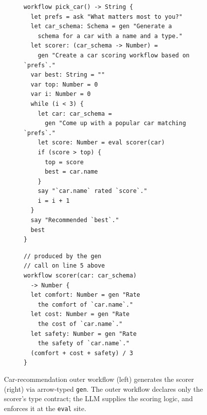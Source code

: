 \begin{figure}[ht!]
\centering
\begin{subfigure}[c]{0.50\linewidth}
\begin{lstlisting}[language=pact,basicstyle=\ttfamily\footnotesize,showstringspaces=false,breaklines=true,breakindent=0pt]
workflow pick_car() -> String {
  let prefs = ask "What matters most to you?"
  let car_schema: Schema = gen "Generate a
    schema for a car with a name and a type."
  let scorer: (car_schema -> Number) =
    gen "Create a car scoring workflow based on `prefs`."
  var best: String = ""
  var top: Number = 0
  var i: Number = 0
  while (i < 3) {
    let car: car_schema =
      gen "Come up with a popular car matching `prefs`."
    let score: Number = eval scorer(car)
    if (score > top) {
      top = score
      best = car.name
    }
    say "`car.name` rated `score`."
    i = i + 1
  }
  say "Recommended `best`."
  best
}
\end{lstlisting}
\end{subfigure}%
\begin{minipage}[c]{0.20\linewidth}
\centering
{}
\end{minipage}%
\begin{subfigure}[c]{0.28\linewidth}
\begin{lstlisting}[language=pact,basicstyle=\ttfamily\footnotesize,showstringspaces=false,breaklines=true,breakindent=0pt]
// produced by the gen
// call on line 5 above
workflow scorer(car: car_schema)
  -> Number {
  let comfort: Number = gen "Rate
    the comfort of `car.name`."
  let cost: Number = gen "Rate
    the cost of `car.name`."
  let safety: Number = gen "Rate
    the safety of `car.name`."
  (comfort + cost + safety) / 3
}
\end{lstlisting}
\end{subfigure}
\caption{Car-recommendation outer workflow (left) generates the scorer (right) via arrow-typed \texttt{gen}. The outer workflow declares only the scorer's type contract; the LLM supplies the scoring logic, and \pact enforces it at the \texttt{eval} site.}
\label{fig:overview-workflow}
\end{figure}
